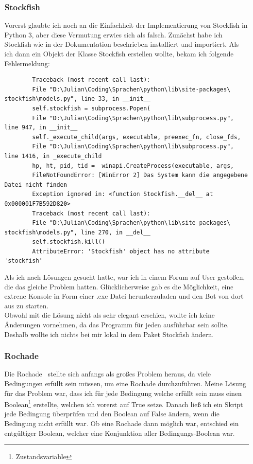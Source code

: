 \documentclass[a4paper, 10pt]{scrartcl}
\begin{document}
\subsubsection*{Stockfish}
Vorerst glaubte ich noch an die Einfachheit der Implementierung von Stockfish in
Python 3, aber diese Vermutung erwies sich als falsch. Zunächst habe ich Stockfish wie in
der Dokumentation beschrieben installiert und importiert. Als ich dann ein Objekt der
Klasse \glqq Stockfish\grqq{} erstellen wollte, bekam ich folgende Fehlermeldung:
\begin{lstlisting}
        Traceback (most recent call last):
        File "D:\Julian\Coding\Sprachen\python\lib\site-packages\ stockfish\models.py", line 33, in __init__
        self.stockfish = subprocess.Popen(
        File "D:\Julian\Coding\Sprachen\python\lib\subprocess.py", line 947, in __init__
        self._execute_child(args, executable, preexec_fn, close_fds,
        File "D:\Julian\Coding\Sprachen\python\lib\subprocess.py", line 1416, in _execute_child
        hp, ht, pid, tid = _winapi.CreateProcess(executable, args,
        FileNotFoundError: [WinError 2] Das System kann die angegebene Datei nicht finden
        Exception ignored in: <function Stockfish.__del__ at 0x000001F7B592D820>
        Traceback (most recent call last):
        File "D:\Julian\Coding\Sprachen\python\lib\site-packages\ stockfish\models.py", line 270, in __del__
        self.stockfish.kill()
        AttributeError: 'Stockfish' object has no attribute 'stockfish'
\end{lstlisting}
Als ich nach Lösungen gesucht hatte, war ich in einem Forum auf User gestoßen,
die das gleiche Problem hatten. Glücklicherweise gab es die Möglichkeit, eine extrene Konsole in Form einer .exe Datei
herunterzuladen und den Bot von dort aus zu starten. \\
Obwohl mit die Lösung nicht als sehr elegant erschien, wollte ich keine Änderungen vornehmen, da das Programm für jeden
ausführbar sein sollte. Deshalb wollte ich nichts bei mir lokal in dem Paket \glqq Stockfish\grqq{} ändern. 

\subsubsection*{Rochade}
Die Rochade~\cite{schachregeln} stellte sich anfangs als großes Problem heraus, da viele Bedingungen erfüllt sein müssen, um eine Rochade durchzuführen.
Meine Lösung für das Problem war, dass ich für jede Bedingung welche erfüllt sein muss einen Boolean\footnote{Zustandsvariable} erstellte, welchen ich vorerst auf \glqq True\grqq{}
setze. Danach ließ ich ein Skript jede Bedingung überprüfen und den Boolean auf \glqq False\grqq{} ändern, wenn die Bedingung nicht erfüllt war.
Ob eine Rochade dann möglich war, entschied ein entgültiger Boolean, welcher eine Konjunktion aller \glqq Bedingungs-Boolean\grqq{} war.
\end{document}
